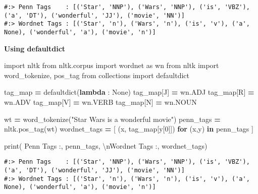 \documentclass[
]{book}
\newenvironment{Shaded}{\begin{snugshade}}{\end{snugshade}}
\newcommand{\BuiltInTok}[1]{#1}
\newcommand{\CharTok}[1]{\textcolor[rgb]{0.5,0.5,0.5}{#1}}
\newcommand{\ControlFlowTok}[1]{\textcolor[rgb]{0.27,0.27,0.27}{\textbf{#1}}}
\newcommand{\DecValTok}[1]{\textcolor[rgb]{0.06,0.06,0.06}{#1}}
\newcommand{\ImportTok}[1]{#1}
\newcommand{\KeywordTok}[1]{\textcolor[rgb]{0.27,0.27,0.27}{\textbf{#1}}}
\newcommand{\NormalTok}[1]{#1}
\newcommand{\OperatorTok}[1]{\textcolor[rgb]{0.43,0.43,0.43}{\textbf{#1}}}
\newcommand{\StringTok}[1]{\textcolor[rgb]{0.5,0.5,0.5}{#1}}
\newcommand{\VariableTok}[1]{\textcolor[rgb]{0,0,0}{#1}}
\begin{document}
\begin{verbatim}
#:> Penn Tags    : [('Star', 'NNP'), ('Wars', 'NNP'), ('is', 'VBZ'), ('a', 'DT'), ('wonderful', 'JJ'), ('movie', 'NN')] 
#:> Wordnet Tags : [('Star', 'n'), ('Wars', 'n'), ('is', 'v'), ('a', None), ('wonderful', 'a'), ('movie', 'n')]
\end{verbatim}

\textbf{Using defaultdict}

\begin{Shaded}
\begin{Highlighting}[]
\ImportTok{import}\NormalTok{ nltk}
\ImportTok{from}\NormalTok{ nltk.corpus }\ImportTok{import}\NormalTok{ wordnet }\ImportTok{as}\NormalTok{ wn}
\ImportTok{from}\NormalTok{ nltk }\ImportTok{import}\NormalTok{ word\_tokenize, pos\_tag}
\ImportTok{from}\NormalTok{ collections }\ImportTok{import}\NormalTok{ defaultdict}

\NormalTok{tag\_map }\OperatorTok{=}\NormalTok{ defaultdict(}\KeywordTok{lambda}\NormalTok{ : }\VariableTok{None}\NormalTok{)}
\NormalTok{tag\_map[}\StringTok{\textquotesingle{}J\textquotesingle{}}\NormalTok{] }\OperatorTok{=}\NormalTok{ wn.ADJ}
\NormalTok{tag\_map[}\StringTok{\textquotesingle{}R\textquotesingle{}}\NormalTok{] }\OperatorTok{=}\NormalTok{ wn.ADV}
\NormalTok{tag\_map[}\StringTok{\textquotesingle{}V\textquotesingle{}}\NormalTok{] }\OperatorTok{=}\NormalTok{ wn.VERB}
\NormalTok{tag\_map[}\StringTok{\textquotesingle{}N\textquotesingle{}}\NormalTok{] }\OperatorTok{=}\NormalTok{ wn.NOUN}

\NormalTok{wt }\OperatorTok{=}\NormalTok{ word\_tokenize(}\StringTok{"Star Wars is a wonderful movie"}\NormalTok{)}
\NormalTok{penn\_tags }\OperatorTok{=}\NormalTok{ nltk.pos\_tag(wt)}
\NormalTok{wordnet\_tags }\OperatorTok{=}\NormalTok{ [ (x, tag\_map[y[}\DecValTok{0}\NormalTok{]]) }\ControlFlowTok{for}\NormalTok{ (x,y) }\KeywordTok{in}\NormalTok{ penn\_tags ]}

\BuiltInTok{print}\NormalTok{(}
\StringTok{\textquotesingle{}Penn Tags    :\textquotesingle{}}\NormalTok{, penn\_tags, }
\StringTok{\textquotesingle{}}\CharTok{\textbackslash{}n}\StringTok{Wordnet Tags :\textquotesingle{}}\NormalTok{, wordnet\_tags)}
\end{Highlighting}
\end{Shaded}

\begin{verbatim}
#:> Penn Tags    : [('Star', 'NNP'), ('Wars', 'NNP'), ('is', 'VBZ'), ('a', 'DT'), ('wonderful', 'JJ'), ('movie', 'NN')] 
#:> Wordnet Tags : [('Star', 'n'), ('Wars', 'n'), ('is', 'v'), ('a', None), ('wonderful', 'a'), ('movie', 'n')]
\end{verbatim}
\end{document}
